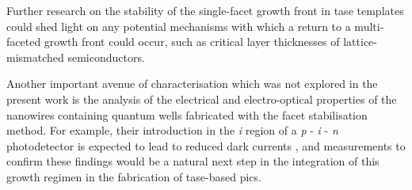 Further research on the stability of the single-facet growth front in \acs{tase} templates could shed light on any potential mechanisms with which a return to a multi-faceted growth front could occur, such as critical layer thicknesses of lattice-mismatched semiconductors.

Another important avenue of characterisation which was not explored in the present work is the analysis of the electrical and electro-optical properties of the nanowires containing quantum wells fabricated with the facet stabilisation method. For example, their introduction in the \textit{i} region of a \textit{p} - \textit{i} - \textit{n} photodetector is expected to lead to reduced dark currents \cite{Xue2021}, and measurements to confirm these findings would be a natural next step in the integration of this growth regimen in the fabrication of \acs{tase}-based \acs{pic}s.
